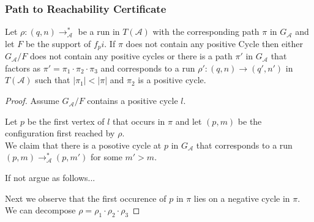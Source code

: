 \documentclass{beamer}
\begin{document}
\begin{frame}
\frametitle{Path to Reachability Certificate}


\begin{lemma}[4.1.13]
Let $\rho: (q,n) \rightarrow ^*_\mathcal{A}$ be a run in $T(\mathcal{A})$ with the corresponding path $\pi$ in $G_\mathcal{A}$ and let $F$ be the support of $f_pi$. If $\pi$ does not contain any positive Cycle then either $G_\mathcal{A}/F$ does not contain any positive cycles or there is a path $\pi'$ in $G_\mathcal{A}$ that factors as $\pi' = \pi_1 \cdot \pi_2 \cdot \pi_3$ and corresponds to a run $\rho' : (q,n) \rightarrow (q', n')$  in $T(\mathcal{A})$ such that $|\pi_1| < |\pi|$ and $\pi_2$ is a positive cycle.


\end{lemma}
\begin{proof}
Assume $G_\mathcal{A}/F$ contains a positive cycle $l$.

Let $p$ be the first vertex of $l$ that occurs in $\pi$ and let $(p, m)$ be the configuration first reached by $\rho$.\\
We claim that there is a posotive cycle at $p$ in $G_\mathcal{A}$ that corresponds to a run $(p, m)\rightarrow^*_\mathcal{A} (p, m')$ for some $m' > m$.

If not argue as follows...

Next we observe that the first occurence of $p$ in $\pi$ lies on a negative cycle in $\pi$. We can decompose $\rho = \rho_1 \cdot \rho_2 \cdot \rho_3$
\end{proof}

\end{frame}
\end{document}
